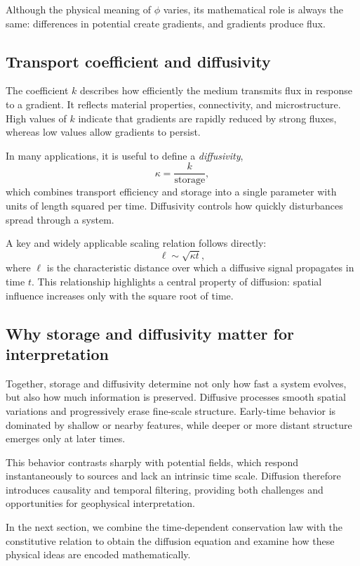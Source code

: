 Although the physical meaning of $\phi$ varies, its mathematical role is always the same: differences in potential create gradients, and gradients produce flux.

\subsection{Transport coefficient and diffusivity}

The coefficient $k$ describes how efficiently the medium transmits flux in response to a gradient. It reflects material properties, connectivity, and microstructure.  High values of $k$ indicate that gradients are rapidly reduced by strong fluxes, whereas low values allow gradients to persist.

In many applications, it is useful to define a \emph{diffusivity},
\[
    \kappa = \frac{k}{\mathrm{storage}},
\]
which combines transport efficiency and storage into a single parameter with units of length squared per time. Diffusivity controls how quickly disturbances spread through a system.

A key and widely applicable scaling relation follows directly:
\[
    \ell \sim \sqrt{\kappa t},
\]
where $\ell$ is the characteristic distance over which a diffusive signal propagates in time $t$. This relationship highlights a central property of diffusion: spatial influence increases only with the square root of time.

\subsection{Why storage and diffusivity matter for interpretation}

Together, storage and diffusivity determine not only how fast a system evolves, but also how much information is preserved. Diffusive processes smooth spatial variations and progressively erase fine-scale structure. Early-time behavior is dominated by shallow or nearby features, while deeper or more distant structure emerges only at later times.

This behavior contrasts sharply with potential fields, which respond instantaneously to sources and lack an intrinsic time scale. Diffusion therefore introduces causality and temporal filtering, providing both challenges and opportunities for geophysical interpretation.

In the next section, we combine the time-dependent conservation law with the constitutive relation to obtain the diffusion equation and examine how these physical ideas are encoded mathematically.

